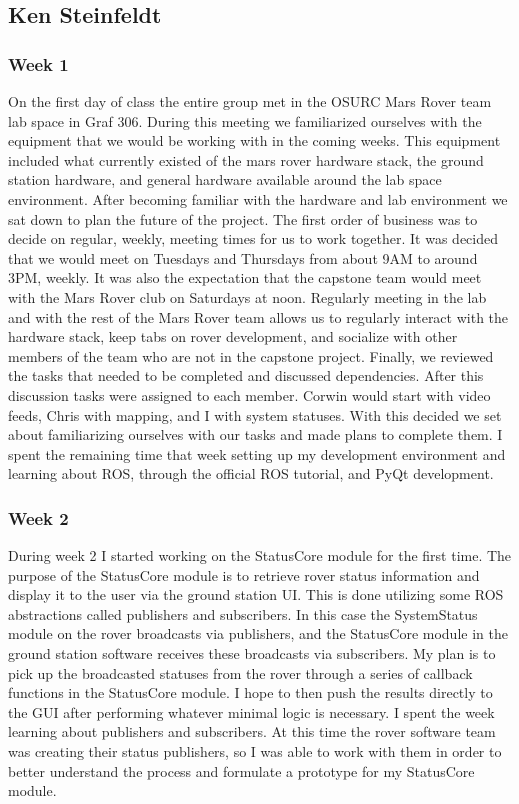 \subsection{Ken Steinfeldt}
\subsubsection{Week 1}
On the first day of class the entire group met in the OSURC Mars Rover team lab space in Graf 306.
During this meeting we familiarized ourselves with the equipment that we would be working with in the coming weeks.
This equipment included what currently existed of the mars rover hardware stack, the ground station hardware, and general hardware available around the lab space environment.
After becoming familiar with the hardware and lab environment we sat down to plan the future of the project.
The first order of business was to decide on regular, weekly, meeting times for us to work together.
It was decided that we would meet on Tuesdays and Thursdays from about 9AM to around 3PM, weekly.
It was also the expectation that the capstone team would meet with the Mars Rover club on Saturdays at noon.
Regularly meeting in the lab and with the rest of the Mars Rover team allows us to regularly interact with the hardware stack, keep tabs on rover development, and socialize with other members of the team who are not in the capstone project.
Finally, we reviewed the tasks that needed to be completed and discussed dependencies.
After this discussion tasks were assigned to each member.
Corwin would start with video feeds, Chris with mapping, and I with system statuses.
With this decided we set about familiarizing ourselves with our tasks and made plans to complete them.
I spent the remaining time that week setting up my development environment and learning about ROS, through the official ROS tutorial, and PyQt development.
\subsubsection{Week 2}
During week 2 I started working on the StatusCore module for the first time.
The purpose of the StatusCore module is to retrieve rover status information and display it to the user via the ground station UI.
This is done utilizing some ROS abstractions called publishers and subscribers.
In this case the SystemStatus module on the rover broadcasts via publishers, and the StatusCore module in the ground station software receives these broadcasts via subscribers.
My plan is to pick up the broadcasted statuses from the rover through a series of callback functions in the StatusCore module.
I hope to then push the results directly to the GUI after performing whatever minimal logic is necessary.
I spent the week learning about publishers and subscribers.
At this time the rover software team was creating their status publishers, so I was able to work with them in order to better understand the process and formulate a prototype for my StatusCore module.
